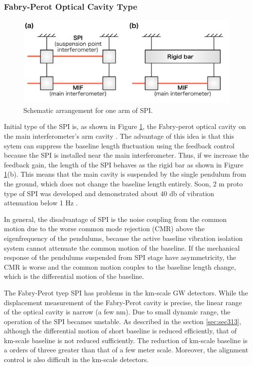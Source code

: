 \subsubsection{Fabry-Perot Optical Cavity Type }
\begin{figure}[h]
  \begin{center}   
    \includegraphics[width=13cm]{./img_chap5/img508.png}
    \caption{Schematic arrangement for one arm of SPI.} \label{img:img508}
  \end{center}
\end{figure}
Initial type of the SPI is, as shown in Figure \ref{img:img508}, the Fabry-perot optical cavity on the main interferometer's arm cavity \cite{drever2002extension}. The advantage of this idea is that this sytem can suppress the baseline length fluctuation using the feedback control because the SPI is installed near the main interferometer. Thus, if we increase the feedback gain, the length of the SPI behaves as the rigid bar as shown in Figure \ref{img:img508}(b). This means that the main cavity is suspended by the single pendulum from the ground, which does not change the baseline length entirely. Soon, 2 m proto type of SPI was developed and demonstrated about 40 db of vibration attenuation below 1 Hz \cite{aso2004stabilization}.

In general, the disadvantage of SPI is the noise coupling from the common motion due to the worse common mode rejection (CMR) above the eigenfrequency of the pendulums, because the active baseline vibration isolation system cannot attenuate the common motion of the baseline. If the mechanical response of the pendulums suspended from SPI stage have asymmetricity, the CMR is worse and the common motion couples to the baseline length change, which is the differential motion of the baseline.

The Fabry-Perot tyep SPI has problems in the km-scale GW detectors. While the displacement measurement of the Fabry-Perot cavity is precise, the linear range of the optical cavity is narrow (a few nm). Due to small dynamic range, the operation of the SPI becames unstable. As described in the section \cref{sec:sec313}, although the differential motion of short baseline is reduced efficiently, that of km-scale baseline is not reduced sufficiently. The reduction of km-scale baseline is a orders of threee greater than that of a few meter scale. Moreover, the alignment control is also difficult in the km-scale detectors.

